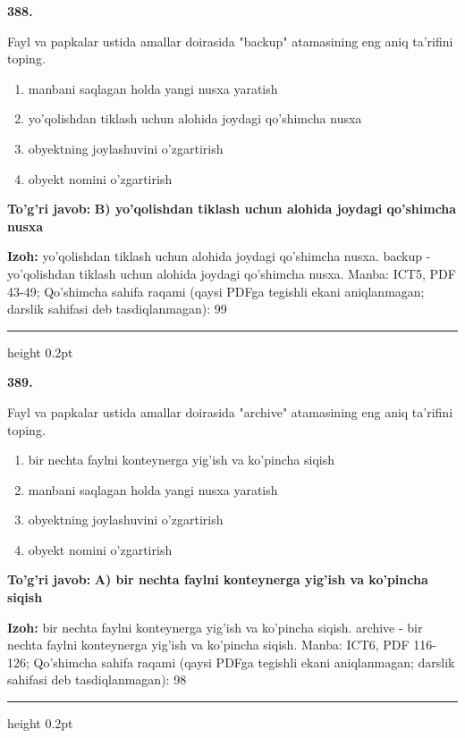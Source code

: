 \documentclass[10pt,a4paper]{article}
\begin{document}
{\bfseries\sffamily\color{ink} 388.}
\par
Fayl va papkalar ustida amallar doirasida "backup" atamasining eng aniq ta'rifini toping.
\begin{enumerate}[label=\Alph*),leftmargin=9mm]
\item manbani saqlagan holda yangi nusxa yaratish
\item yo'qolishdan tiklash uchun alohida joydagi qo'shimcha nusxa
\item obyektning joylashuvini o'zgartirish
\item obyekt nomini o'zgartirish
\end{enumerate}
\begin{tcolorbox}[enhanced,breakable,colback=teal!4,colframe=teal!60!black,boxrule=0.45pt,arc=1.2mm,left=2.7mm,right=2.7mm,top=1.8mm,bottom=1.8mm,before skip=2mm,after skip=2mm]
{\bfseries\sffamily\color{teal}To'g'ri javob:} \textbf{B) yo'qolishdan tiklash uchun alohida joydagi qo'shimcha nusxa}
\par\smallskip
{\bfseries Izoh:} yo'qolishdan tiklash uchun alohida joydagi qo'shimcha nusxa. backup - yo'qolishdan tiklash uchun alohida joydagi qo'shimcha nusxa. Manba: ICT5, PDF 43-49; Qo'shimcha sahifa raqami (qaysi PDFga tegishli ekani aniqlanmagan; darslik sahifasi deb tasdiqlanmagan): 99
\end{tcolorbox}
\vspace{2mm}\hrule height 0.2pt\vspace{3mm}

{\bfseries\sffamily\color{ink} 389.}
\par
Fayl va papkalar ustida amallar doirasida "archive" atamasining eng aniq ta'rifini toping.
\begin{enumerate}[label=\Alph*),leftmargin=9mm]
\item bir nechta faylni konteynerga yig'ish va ko'pincha siqish
\item manbani saqlagan holda yangi nusxa yaratish
\item obyektning joylashuvini o'zgartirish
\item obyekt nomini o'zgartirish
\end{enumerate}
\begin{tcolorbox}[enhanced,breakable,colback=teal!4,colframe=teal!60!black,boxrule=0.45pt,arc=1.2mm,left=2.7mm,right=2.7mm,top=1.8mm,bottom=1.8mm,before skip=2mm,after skip=2mm]
{\bfseries\sffamily\color{teal}To'g'ri javob:} \textbf{A) bir nechta faylni konteynerga yig'ish va ko'pincha siqish}
\par\smallskip
{\bfseries Izoh:} bir nechta faylni konteynerga yig'ish va ko'pincha siqish. archive - bir nechta faylni konteynerga yig'ish va ko'pincha siqish. Manba: ICT6, PDF 116-126; Qo'shimcha sahifa raqami (qaysi PDFga tegishli ekani aniqlanmagan; darslik sahifasi deb tasdiqlanmagan): 98
\end{tcolorbox}
\vspace{2mm}\hrule height 0.2pt\vspace{3mm}
\end{document}
